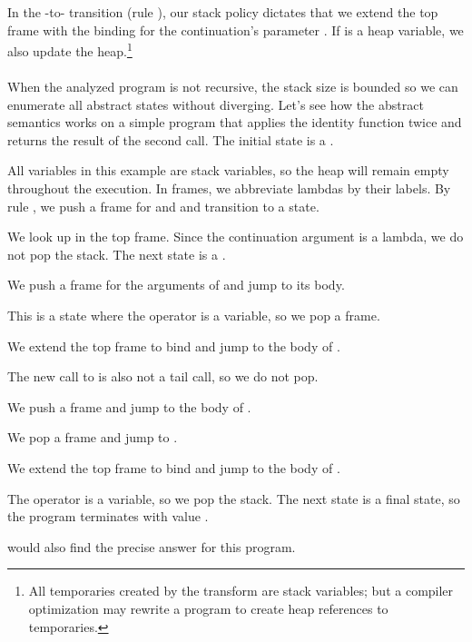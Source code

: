 \documentclass{LMCS}
\theoremstyle{definition} \newtheorem{property}[thm]{Property}
\begin{document}
In the \dacapply-to-\daeval{} transition (rule ), our stack policy
dictates that we extend the top frame with the binding for the continuation's
parameter . 
If  is a heap variable, we also update the heap.\footnote{All temporaries
created by the \cps{} transform are stack variables; but a compiler 
optimization may rewrite a program to create heap references to temporaries.}

\paragraph{}
When the analyzed program is not recursive, the stack size is bounded so we can
enumerate all abstract states without diverging.
Let's see how the abstract semantics works on a simple program that applies the
identity function twice and returns the result of the second call.
The initial state \ainitstate{} is a \dauapply.
{\newcommand{\callh}{\tw{(h n2)}}
  \newcommand{\lamii}{\tw{(\ilam{2}(n2)\callh)}}
  \newcommand{\callii}{\tw{(id 2 \lamii)}}
  \newcommand{\lami}{\tw{(\ilam{1}(n1)\callii)}}
  \newcommand{\calli}{\tw{(id 1 \lami)}}
  \newcommand{\lamtop}{\tw{(\lam(id h)\calli)}}
  \newcommand{\callid}{\tw{(k x)}}
  \newcommand{\lamid}{\tw{(\ilam{3}(x k)\callid)}}
  \newcommand{\framei}{\onemap{\tw{id}}{\mset{\ilam{3}}}
    \onemap{\tw{h}}{\haltcont}}
  \newcommand{\frameii}{\onemap{\tw{n1}}{\mset{1}}\framei}
  \newcommand{\frameiii}{\onemap{\tw{n2}}{\mset{2}}\frameii}
  \newcommand{\frameidi}{\onemap{\tw{x}}{\mset{1}}\onemap{\tw{k}}{\ilam{1}}}
  \newcommand{\frameidii}{\onemap{\tw{x}}{\mset{2}}\onemap{\tw{k}}{\ilam{2}}}
   
  All variables in this example are stack variables, so the heap will remain
  empty throughout the execution.
  In frames, we abbreviate lambdas by their labels.
  By rule , we push a frame for  and  and transition to
  a \daueval{} state.
  
  We look up  in the top frame.
  Since the continuation argument is a lambda, we do not pop the stack.
  The next state is a \dauapply.
  
  We push a frame for the arguments of  and jump to its body.
  
  This is a \daceval{} state where the operator is a variable, so we pop a 
  frame.
  
  We extend the top frame to bind  and jump to the body of .
  
  The new call to  is also not a tail call, so we do not pop.
  
  We push a frame and jump to the body of .
  
  We pop a frame and jump to .
  
  We extend the top frame to bind  and jump to the body of .
  
  The operator is a variable, so we pop the stack.
  The next state is a final state, so the program terminates with value 
  .
  
} would also find the precise answer for this program.
\end{document}
